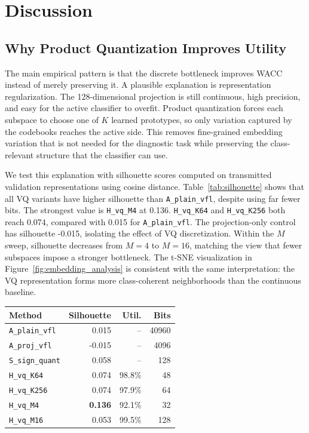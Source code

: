 \documentclass{article}
\begin{document}
\section{Discussion}
\subsection{Why Product Quantization Improves Utility}

The main empirical pattern is that the discrete bottleneck improves WACC instead of merely preserving it. A plausible explanation is representation regularization. The 128-dimensional projection is still continuous, high precision, and easy for the active classifier to overfit. Product quantization forces each subspace to choose one of $K$ learned prototypes, so only variation captured by the codebooks reaches the active side. This removes fine-grained embedding variation that is not needed for the diagnostic task while preserving the class-relevant structure that the classifier can use.

We test this explanation with silhouette scores \citep{rousseeuw1987silhouettes} computed on transmitted validation representations using cosine distance. Table~\ref{tab:silhouette} shows that all VQ variants have higher silhouette than \texttt{A\_plain\_vfl}, despite using far fewer bits. The strongest value is \texttt{H\_vq\_M4} at 0.136. \texttt{H\_vq\_K64} and \texttt{H\_vq\_K256} both reach 0.074, compared with 0.015 for \texttt{A\_plain\_vfl}. The projection-only control has silhouette -0.015, isolating the effect of VQ discretization. Within the $M$ sweep, silhouette decreases from $M=4$ to $M=16$, matching the view that fewer subspaces impose a stronger bottleneck. The t-SNE visualization \citep{vandermaaten2008tsne} in Figure~\ref{fig:embedding_analysis} is consistent with the same interpretation: the VQ representation forms more class-coherent neighborhoods than the continuous baseline.

\begin{center}
\label{tab:silhouette}
\centering
\small
\setlength{\tabcolsep}{4pt}
\begin{tabular}{lrrr}
\toprule
Method & Silhouette & Util. & Bits \\
\midrule
\texttt{A\_plain\_vfl} & 0.015 & -- & 40960 \\
\texttt{A\_proj\_vfl} & -0.015 & -- & 4096 \\
\texttt{S\_sign\_quant} & 0.058 & -- & 128 \\
\texttt{H\_vq\_K64} & 0.074 & 98.8\% & 48 \\
\texttt{H\_vq\_K256} & 0.074 & 97.9\% & 64 \\
\texttt{H\_vq\_M4} & \textbf{0.136} & 92.1\% & 32 \\
\texttt{H\_vq\_M16} & 0.053 & 99.5\% & 128 \\
\bottomrule
\end{tabular}
\end{center}
\end{document}
